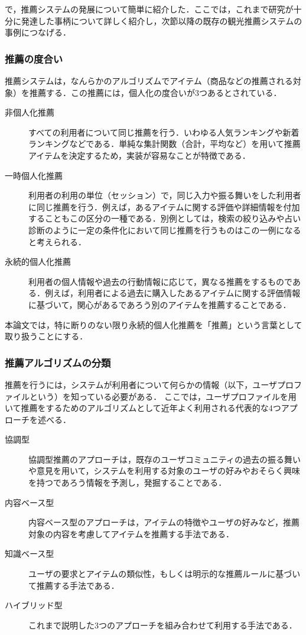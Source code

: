\documentclass{jsarticle}
\begin{document}
\label{evolution_recommendation_system} で，推薦システムの発展について簡単に紹介した．ここでは，これまで研究が十分に発達した事柄について詳しく紹介し，次節以降の既存の観光推薦システムの事例につなげる．

\subsubsection{推薦の度合い}

推薦システムは，なんらかのアルゴリズムでアイテム（商品などの推薦される対象）を推薦する．この推薦には，個人化の度合いが3つあるとされている\cite{define_of_recommendation_system}\cite{recommendation_type_of_personalize}．

\begin{description}
\item[非個人化推薦] すべての利用者について同じ推薦を行う．いわゆる人気ランキングや新着ランキングなどである．単純な集計関数（合計，平均など）を用いて推薦アイテムを決定するため，実装が容易なことが特徴である．
\item[一時個人化推薦] 利用者の利用の単位（セッション）で，同じ入力や振る舞いをした利用者に同じ推薦を行う．例えば，あるアイテムに関する評価や詳細情報を付加することもこの区分の一種である．別例としては，検索の絞り込みや占い診断のように一定の条件化において同じ推薦を行うものはこの一例になると考えられる．
\item[永続的個人化推薦] 利用者の個人情報や過去の行動情報に応じて，異なる推薦をするものである．例えば，利用者による過去に購入したあるアイテムに関する評価情報に基づいて，関心があるであろう別のアイテムを推薦することである．
\end{description}

本論文では，特に断りのない限り永続的個人化推薦を「推薦」という言葉として取り扱うことにする．

\subsubsection{推薦アルゴリズムの分類}

推薦を行うには，システムが利用者について何らかの情報（以下，ユーザプロファイルという）を知っている必要がある．
ここでは，ユーザプロファイルを用いて推薦をするためのアルゴリズムとして近年よく利用される代表的な4つアプローチを述べる．

\begin{description}
\item[協調型] 協調型推薦のアプローチは，既存のユーザコミュニティの過去の振る舞いや意見を用いて，システムを利用する対象のユーザの好みやおそらく興味を持つであろう情報を予測し，発掘することである．
\item[内容ベース型] 内容ベース型のアプローチは，アイテムの特徴やユーザの好みなど，推薦対象の内容を考慮してアイテムを推薦する手法である．
\item[知識ベース型] ユーザの要求とアイテムの類似性，もしくは明示的な推薦ルールに基づいて推薦する手法である．
\item[ハイブリッド型] これまで説明した3つのアプローチを組み合わせて利用する手法である．
\end{description}
\end{document}

